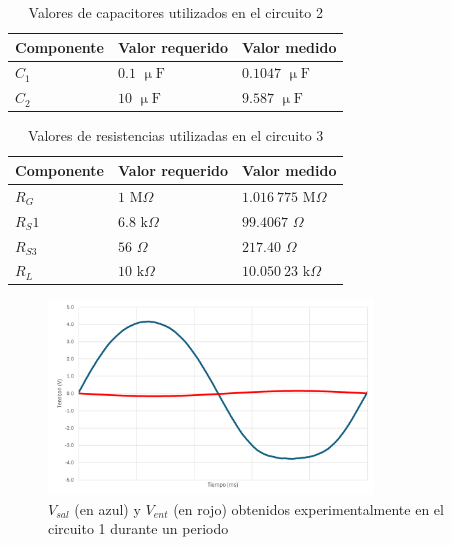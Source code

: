 \documentclass[journal]{IEEEtran}
\begin{document}
\begin{table}[H]
        \renewcommand{\arraystretch}{1.5}
        \caption{Valores de capacitores utilizados en el circuito 2}
        \centering
        \begin{tabular}{ >{\centering\arraybackslash}m{2.5cm} >{\centering\arraybackslash}m{2.5cm} >{\centering\arraybackslash}m{2.5cm} }
                \hline
            Componente & Valor requerido & Valor medido\\ 
            \hline
            $C_1$ & $0.1$ $\upmu\mathrm{F}$ & $0.1047$ $\upmu\mathrm{F}$ \\ 
            $C_2$ & $10$ $\upmu\mathrm{F}$ & $9.587$ $\upmu\mathrm{F}$ \\
            \hline
        \end{tabular}
        \label{tabla4}
    \end{table}

\begin{table}[H]
        \renewcommand{\arraystretch}{1.5}
        \caption{Valores de resistencias utilizadas en el circuito 3}
        \centering
        \begin{tabular}{ >{\centering\arraybackslash}m{2.5cm} >{\centering\arraybackslash}m{2.5cm} >{\centering\arraybackslash}m{2.5cm} }
                \hline
            Componente & Valor requerido & Valor medido\\ 
            \hline
            $R_G$ & $1$ $\mathrm{M}\Omega$ & $1.016~775$ $\mathrm{M}\Omega$ \\ 
            $R_S1$ & $6.8$ $\mathrm{k}\Omega$ & $99.4067$ $\Omega$ \\
            $R_{S3}$ & $56$ $\Omega$ & $217.40$ $\Omega$ \\
            $R_L$ & $10$ $\mathrm{k}\Omega$ & $10.050~23$ $\mathrm{k}\Omega$ \\
            \hline
        \end{tabular}
        \label{tabla5}
    \end{table}


\begin{figure}[H]
        \centering
        \includegraphics[width=3.4in]{C1111.png}
        \caption{$V_{sal}$ (en azul) y $V_{ent}$ (en rojo) obtenidos experimentalmente en el circuito 1 durante un periodo}
        \label{fig:SignalExperimental_02}
\end{figure}
\end{document}
